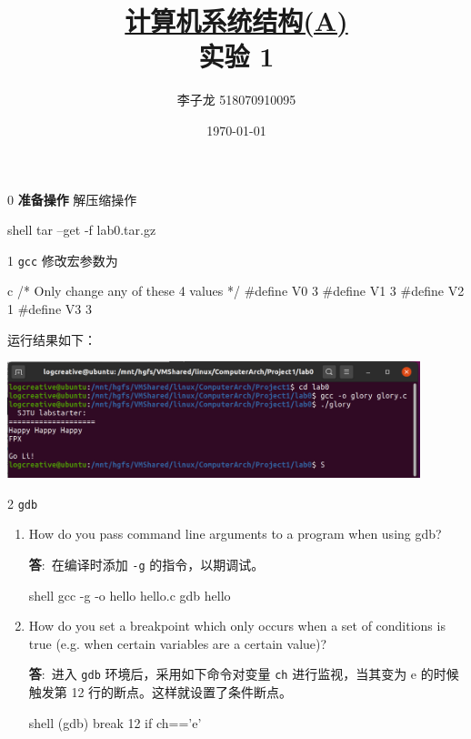 \documentclass[12pt,a4paper]{article}
\newenvironment{problems}{\begin{list}{}{\renewcommand{\makelabel}[1]{\textbf{##1}.\hfil}}}{\end{list}}
\providecommand{\ans}{\textbf{答}:~}
\begin{document}
\title{\normalsize \underline{计算机系统结构(A)}\\\LARGE 实验 1}
\author{李子龙 518070910095}
\date{\today}
\maketitle

\begin{problems}
    \item[0] \textbf{准备操作}
    解压缩操作
    \begin{code}{shell}
        tar --get -f lab0.tar.gz
    \end{code}
    \item[1] \texttt{gcc} 修改宏参数为
    \begin{code}{c}
/* Only change any of these 4 values */
#define V0 3
#define V1 3
#define V2 1
#define V3 3
    \end{code}
    运行结果如下：

    \includegraphics[width=0.9\textwidth]{gcc.png}

    \item[2] \texttt{gdb}
    \begin{enumerate}[(1)]
        \item How do you pass command line arguments to a program when using gdb?
        
        \ans 在编译时添加 \texttt{-g} 的指令，以期调试。
        \begin{code}{shell}
            gcc -g -o hello hello.c
            gdb hello
        \end{code}

        \item How do you set a breakpoint which only occurs when a set of conditions is true (e.g. when certain variables are a certain value)?
        
        \ans 进入 \texttt{gdb} 环境后，采用如下命令对变量 \texttt{ch} 进行监视，当其变为 e 的时候触发第 12 行的断点。这样就设置了条件断点。
        \begin{code}{shell}
            (gdb) break 12 if ch=='e'
        \end{code}


\end{enumerate}
\end{problems}
\end{document}
